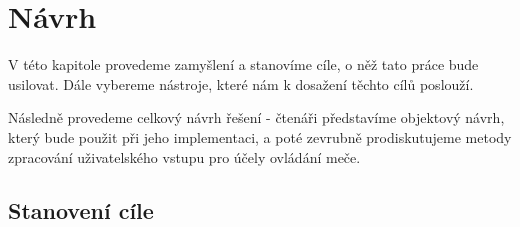 \chapter{Návrh}

V této kapitole provedeme zamyšlení a stanovíme cíle, o něž tato práce bude usilovat. Dále vybereme nástroje, které nám k dosažení těchto cílů poslouží.  

Následně provedeme celkový návrh řešení - čtenáři představíme objektový návrh, který bude použit při jeho implementaci, a poté zevrubně prodiskutujeme metody zpracování uživatelského vstupu pro účely ovládání meče.

\section{Stanovení cíle}


